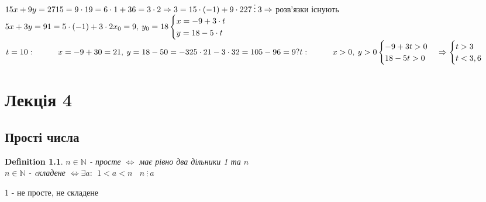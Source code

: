 \documentclass[a4paper,12pt]{bookest}
\newtheorem{definition}{Definition}[section]
\newcommand\tab[1][1cm]{\hspace*{#1}}
\begin{document}
\begin{example}
$15x+9y=27\\ 15=9\cdot 1\\9=6\cdot 1+3\\6=3\cdot 2\Rightarrow3=15\cdot(-1)+9\cdot 2\\27\>\vdots\>3\Rightarrow$ розв'язки існують \\
$5x+3y=9\\1=5\cdot(-1)+3\cdot2\\x_0=9,\>y_0=18\\\begin{cases}
	x=-9+3\cdot t\\y=18-5\cdot t
\end{cases}$ $t=10:\tab x=-9+30=21,\>y=18-50=-32\\5\cdot21-3\cdot32=105-96=9\\?t:\tab x>0,\>y>0\\\begin{cases}
	-9+3t>0\\18-5t>0
	\end{cases}\Rightarrow\begin{cases}
		t>3\\t<3,6
	\end{cases}$
\end{example}
\chapter{Лекція 4}
\section{Прості числа}
\begin{definition}
	
$n\in\mathbb{N}$ - просте $\Leftrightarrow$ має рівно два дільники 1 та $n$\\
$n\in\mathbb{N}$ - cкладене $\Leftrightarrow\exists a:\>\>1<a<n\>\>\>\>n\>\vdots\>a$\\
\end{definition}
1 - не просте, не складене
\end{document}
